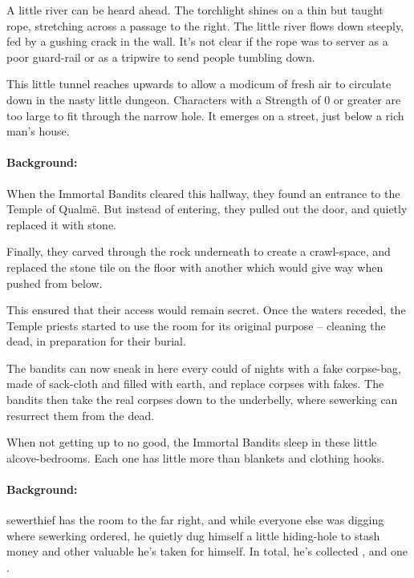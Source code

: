 \begin{multicols}{2}
\begin{boxtext}

  A little river can be heard ahead.
  The torchlight shines on a thin but taught rope, stretching across a passage to the right.
  The little river flows down steeply, fed by a gushing crack in the wall.
  It's not clear if the rope was to server as a poor guard-rail or as a tripwire to send people tumbling down.

\end{boxtext}


This little tunnel reaches upwards to allow a modicum of fresh air to circulate down in the nasty little dungeon.  Characters with a Strength of 0 or greater are too large to fit through the narrow hole.  It emerges on a street, just below a rich man's house.


\paragraph{Background:}
When the Immortal Bandits cleared this hallway, they found an entrance to the Temple of Qualm\"e.
But instead of entering, they pulled out the door, and quietly replaced it with stone.

Finally, they carved through the rock underneath to create a crawl-space, and replaced the stone tile on the floor with another which would give way when pushed from below.

This ensured that their access would remain secret.
Once the waters receded, the Temple priests started to use the room for its original purpose -- cleaning the dead, in preparation for their burial.

The bandits can now sneak in here every could of nights with a fake corpse-bag, made of sack-cloth and filled with earth, and replace corpses with fakes.
The bandits then take the real corpses down to the underbelly, where \gls{sewerking} can resurrect them from the dead.


When not getting up to no good, the Immortal Bandits sleep in these little alcove-bedrooms.
Each one has little more than blankets and clothing hooks.

\paragraph{Background:}
\Gls{sewerthief} has the room to the far right, and while everyone else was digging where \gls{sewerking} ordered, he quietly dug himself a little hiding-hole to stash money and other valuable he's taken for himself.
In total, he's collected \lootMedium, and one \lootMagic.


\end{multicols}
